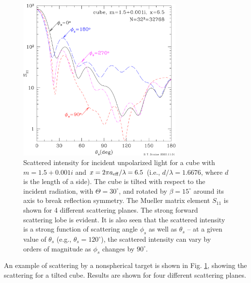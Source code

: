 \begin{figure}
\begin{center}
\vspace*{-0.9cm}
\includegraphics[width=8.3cm]{f_cube_S11.png}
\vspace*{-2.2cm}
\caption{\label{fig:cube_S11}
\footnotesize
Scattered intensity for incident unpolarized light for a cube
with $m=1.5+0.001i$ and $x=2\pi a_{\rm eff}/\lambda=6.5$ 
(i.e., $d/\lambda=1.6676$, where $d$ is the length of a side).
The cube is tilted with respect to the incident radiation, with
$\Theta=30^\circ$, and rotated by $\beta=15^\circ$ around its axis
to break reflection symmetry.
The Mueller matrix element $S_{11}$ is shown for 4 different scattering
planes.  
The strong forward scattering lobe is evident.
It is also seen that the scattered intensity is a strong function
of scattering angle $\phi_s$ as well as $\theta_s$ -- at a given
value of $\theta_s$ (e.g., $\theta_s=120^\circ$), 
the scattered intensity can vary by orders of magnitude
as $\phi_s$ changes by $90^\circ$.}
\end{center}
\end{figure}

An example of scattering by a nonspherical target is shown in Fig.
\ref{fig:cube_S11}, showing the scattering for a tilted cube.
Results are shown for
four different scattering planes.

